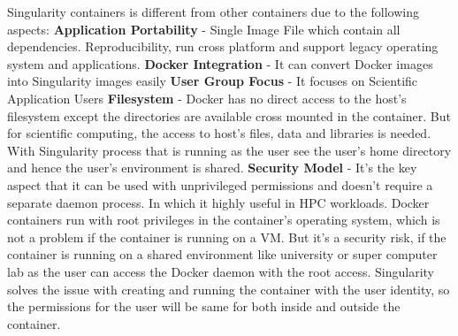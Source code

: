 \documentclass[sigconf]{acmart}
\begin{document}
	Singularity containers is different from other containers due to the following aspects:
	\textbf{Application Portability} - Single Image File which contain all dependencies. Reproducibility, run cross platform and support legacy operating system and applications.\newline
	\textbf{Docker Integration} - It can convert Docker images into Singularity images easily \newline
	\textbf{User Group Focus} - It focuses on Scientific Application Users \newline
	\textbf{Filesystem} - Docker has no direct access to the host's filesystem except the directories are available cross mounted in the container. But for scientific computing, the access to host's files, data and libraries is needed. With Singularity process that is running as the user see the user's home directory and hence the user's environment is shared. \newline
	\textbf{Security Model} - It's the key aspect that it can be used with unprivileged permissions and doesn't require a separate daemon process. In which it highly useful in HPC workloads.\newline
	Docker containers run with root privileges in the container's operating system, which is not a problem if the container is running on a VM. But
	it's a security risk, if the container is running on a shared environment like university or super computer lab as the user can access the
	Docker daemon with the root access. Singularity solves the issue with creating and running the container with the user identity, so the permissions for the user will be same for both inside and outside the container.\newline
	\cite{Singularity}
	
	 
	
\end{document}
